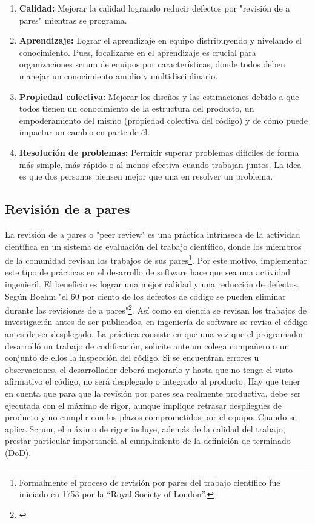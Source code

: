 \begin{enumerate}

\item \textbf{Calidad:} Mejorar la calidad logrando reducir defectos por "revisión de a pares" mientras se programa.

\item \textbf{Aprendizaje:} Lograr el aprendizaje en equipo distribuyendo y nivelando el conocimiento. Pues, focalizarse en el aprendizaje es crucial para organizaciones scrum de equipos por características, donde todos deben manejar un conocimiento amplio y multidisciplinario. 

\item \textbf{Propiedad colectiva:}
Mejorar los diseños y las estimaciones debido a que todos tienen un conocimiento de la estructura del producto, un empoderamiento del mismo (propiedad colectiva del código) y de cómo puede impactar un cambio en parte de él.

\item \textbf{Resolución de problemas:} Permitir superar problemas difíciles de forma más simple, más rápido o al menos efectiva cuando trabajan juntos. La idea es que dos personas piensen mejor que una en resolver un problema.

\end{enumerate}

\subsection{Revisión de a pares}

La revisión de a pares o "peer review" es una práctica intrínseca de la actividad científica en un sistema de evaluación del trabajo científico, donde los miembros de la comunidad revisan los trabajos de sus pares\footnote{Formalmente el proceso de revisión por pares del trabajo científico fue iniciado en 1753 por la “Royal Society of London”.}. Por este motivo, implementar este tipo de prácticas en el desarrollo de software hace que sea una actividad ingenieril. El beneficio es lograr una mejor calidad y una reducción de defectos. Según Boehm "el 60 por ciento de los defectos de código se pueden eliminar durante las revisiones de a pares"\footnote{\cite{Boehm-2001}}. Así como en ciencia se revisan los trabajos de investigación antes de ser publicados, en ingeniería de software se revisa el código antes de ser desplegado.\newline
La práctica consiste en que una vez que el programador desarrolló un trabajo de codificación, solicite ante un colega compañero o un conjunto de ellos la inspección del código. Si se encuentran errores u observaciones, el desarrollador deberá mejorarlo y hasta que no tenga el visto afirmativo el código, no será desplegado o integrado al producto. Hay que tener en cuenta que para que la revisión por pares sea realmente productiva, debe ser ejecutada con el máximo de rigor, aunque implique retrasar despliegues de producto y no cumplir con los plazos comprometidos por el equipo. Cuando se aplica Scrum, el máximo de rigor incluye, además de la calidad del trabajo, prestar particular importancia al cumplimiento de la definición de terminado (DoD).

